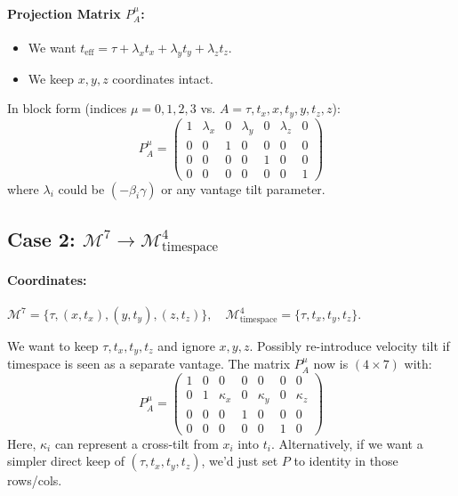 \documentclass{article}
\begin{document}
\paragraph{Projection Matrix $P^{\mu}_{A}$:}
\begin{itemize}
\item We want $t_{\text{eff}} = \tau + \lambda_x t_x + \lambda_y t_y + \lambda_z t_z$.
\item We keep $x, y, z$ coordinates intact.
\end{itemize}
In block form (indices $\mu=0,1,2,3$ vs. $A=\tau, t_x, x, t_y, y, t_z, z$):
\begin{equation}
P^{\mu}_{A} = \begin{pmatrix}
1 & \lambda_x & 0 & \lambda_y & 0 & \lambda_z & 0\\
0 & 0 & 1 & 0 & 0 & 0 & 0 \\ 
0 & 0 & 0 & 0 & 1 & 0 & 0 \\ 
0 & 0 & 0 & 0 & 0 & 0 & 1
\end{pmatrix}
\end{equation}
where $\lambda_i$ could be $(-\beta_i \gamma)$ or any vantage tilt parameter.

\subsection{Case 2: $\mathcal{M}^7 \to \mathcal{M}^4_{\text{timespace}}$}
\label{sec:CaseTimespace}

\paragraph{Coordinates:} \(
\mathcal{M}^7=\{\tau, (x,t_x),(y,t_y),(z,t_z)\},\quad\mathcal{M}^4_{\text{timespace}}=\{\tau, t_x, t_y, t_z\}.
\)

We want to keep $\tau, t_x, t_y, t_z$ and ignore $x,y,z$. Possibly re-introduce velocity tilt if timespace is seen as a separate vantage. The matrix $P^{\mu}_{A}$ now is $(4\times7)$ with:
\begin{equation}
P^{\mu}_{A} = \begin{pmatrix}
1 & 0 & 0 & 0 & 0 & 0 & 0 \\ 
0 & 1 & \kappa_x & 0 & \kappa_y & 0 & \kappa_z \\ 
0 & 0 & 0 & 1 & 0 & 0 & 0 \\ 
0 & 0 & 0 & 0 & 0 & 1 & 0
\end{pmatrix}
\end{equation}
Here, $\kappa_i$ can represent a cross-tilt from $x_i$ into $t_i$. Alternatively, if we want a simpler direct keep of $(\tau,t_x,t_y,t_z)$, we’d just set $P$ to identity in those rows/cols.
\end{document}
